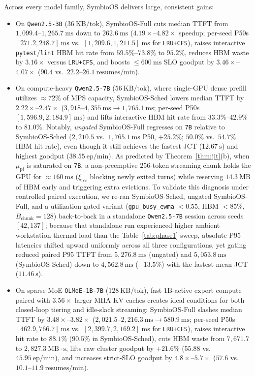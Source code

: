 \documentclass[10pt,journal,compsoc]{IEEEtran}
\theoremstyle{definition}
\theoremstyle{remark}
\newcommand{\SymbioOS}{\textup{\textsc{SymbioOS}}}
\newcommand{\SymbioSched}{\textup{\textsc{SymbioOS-Sched}}}
\newcommand{\SymbioFull}{\textup{\textsc{SymbioOS-Full}}}
\def\SymbioOS{SymbioOS}%
\def\SymbioSched{SymbioOS-Sched}%
\def\SymbioFull{SymbioOS-Full}%
\begin{document}
Across every model family, \SymbioOS{} delivers large, consistent gains:
\begin{itemize}
\item On \texttt{Qwen2.5-3B} ($36~\mathrm{KB/tok}$), \SymbioFull{} cuts median TTFT from $1{,}099.4$--$1{,}265.7~\mathrm{ms}$ down to $262.6~\mathrm{ms}$ ($4.19\times$--$4.82\times$ speedup; per-seed P50s $[271.2, 248.7]~\mathrm{ms}$ vs.\ $[1{,}209.6, 1{,}211.5]~\mathrm{ms}$ for \texttt{LRU+CFS}), raises interactive \texttt{pytest}/\texttt{lint} HBM hit rate from $59.5\%$--$73.8\%$ to $95.2\%$, reduces HBM waste by $3.16\times$ versus \texttt{LRU+CFS}, and boosts $\le 600~\mathrm{ms}$ SLO goodput by $3.46\times$--$4.07\times$ ($90.4$ vs.\ $22.2$--$26.1~\mathrm{resumes/min}$).
\item On compute-heavy \texttt{Qwen2.5-7B} ($56~\mathrm{KB/tok}$), where single-GPU dense prefill utilizes $\approx 72\%$ of MPS capacity, \SymbioSched{} lowers median TTFT by $2.22\times$--$2.47\times$ ($3{,}918$--$4{,}355~\mathrm{ms} \to 1{,}765.1~\mathrm{ms}$; per-seed P50s $[1{,}596.9, 2{,}184.9]~\mathrm{ms}$) and lifts interactive HBM hit rate from $33.3\%$--$42.9\%$ to $81.0\%$. Notably, \emph{ungated} \SymbioFull{} regresses on \texttt{7B} relative to \SymbioSched{} ($2{,}210.5$ vs.\ $1{,}765.1~\mathrm{ms}$ P50, $+25.2\%$; $50.0\%$ vs.\ $54.7\%$ HBM hit rate), even though it still achieves the fastest JCT ($12.67~\mathrm{s}$) and highest goodput ($38.55~\mathrm{ep/min}$). As predicted by Theorem~\ref{thm:jit}(b), when $\mu_{\mathrm{pf}}$ is saturated on \texttt{7B}, a non-preemptive $256$-token streaming chunk holds the GPU for $\approx 160~\mathrm{ms}$ ($\bar{\xi}_{\mathrm{res}}$ blocking newly exited turns) while reserving $14.3~\mathrm{MB}$ of HBM early and triggering extra evictions. To validate this diagnosis under controlled paired execution, we re-ran \SymbioSched{}, ungated \SymbioFull{}, and a utilization-gated variant (\texttt{gpu\_busy\_ewma} $< 0.55$, HBM $< 85\%$, $B_{\mathrm{chunk}} = 128$) back-to-back in a standalone \texttt{Qwen2.5-7B} session across seeds $[42, 137]$; because that standalone run experienced higher ambient workstation thermal load than the Table~\ref{tab:phase1} sweep, absolute P95 latencies shifted upward uniformly across all three configurations, yet gating reduced paired P95 TTFT from $5{,}276.8~\mathrm{ms}$ (ungated) and $5{,}053.8~\mathrm{ms}$ (\SymbioSched{}) down to $4{,}562.8~\mathrm{ms}$ ($-13.5\%$) with the fastest mean JCT ($11.46~\mathrm{s}$).
\item On sparse MoE \texttt{OLMoE-1B-7B} ($128~\mathrm{KB/tok}$), fast $1\mathrm{B}$-active expert compute paired with $3.56\times$ larger MHA KV caches creates ideal conditions for both closed-loop tiering and idle-slack streaming: \SymbioFull{} slashes median TTFT by $3.48\times$--$3.82\times$ ($2{,}021.5$--$2{,}216.3~\mathrm{ms} \to 580.9~\mathrm{ms}$; per-seed P50s $[462.9, 766.7]~\mathrm{ms}$ vs.\ $[2{,}399.7, 2{,}169.2]~\mathrm{ms}$ for \texttt{LRU+CFS}), raises interactive hit rate to $88.1\%$ ($90.5\%$ in \SymbioSched{}), cuts HBM waste from $7{,}671.7$ to $2{,}827.3~\mathrm{MB}\cdot\mathrm{s}$, lifts raw cluster goodput by $+21.6\%$ ($55.88$ vs.\ $45.95~\mathrm{ep/min}$), and increases strict-SLO goodput by $4.8\times$--$5.7\times$ ($57.6$ vs.\ $10.1$--$11.9~\mathrm{resumes/min}$).

\end{itemize}
\end{document}
